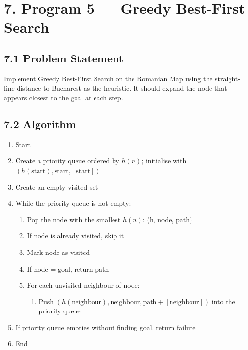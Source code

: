 \documentclass[12pt,a4paper]{article}
\begin{document}
\section*{7. Program 5 --- Greedy Best-First Search}

\subsection*{7.1 Problem Statement}

Implement Greedy Best-First Search on the Romanian Map using the straight-line distance to Bucharest as the heuristic. It should expand the node that appears closest to the goal at each step.

\subsection*{7.2 Algorithm}

\begin{enumerate}[leftmargin=1.6em]
  \item Start
  \item Create a priority queue ordered by $h(n)$; initialise with $(h(\text{start}), \text{start}, [\text{start}])$
  \item Create an empty visited set
  \item While the priority queue is not empty:
  \begin{enumerate}[leftmargin=1.6em,label=(\alph*)]
    \item Pop the node with the smallest $h(n)$: (h, node, path)
    \item If node is already visited, skip it
    \item Mark node as visited
    \item If node = goal, return path
    \item For each unvisited neighbour of node:
    \begin{enumerate}[leftmargin=1.6em,label=\roman*.]
      \item Push $(h(\text{neighbour}), \text{neighbour}, \text{path}+[\text{neighbour}])$ into the priority queue
    \end{enumerate}
  \end{enumerate}
  \item If priority queue empties without finding goal, return failure
  \item End
\end{enumerate}
\end{document}
